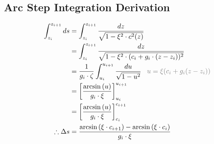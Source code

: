 \documentclass{article}
\begin{document}
\subsection{Arc Step Integration Derivation}
\begin{align*}
	\int_{z_i}^{z_{i+1}}ds & = \int_{z_i}^{z_{i+1}}\frac{dz}{\sqrt{1-\xi^2\cdot c^2(z)}}                                                       \\
	                       & = \int_{z_i}^{z_{i+1}}\frac{dz}{\sqrt{1-\xi^2\cdot (c_i + g_i\cdot(z - z_i))^2}}                                  \\
	                       & = \frac{1}{g_i\cdot\zeta}\int_{u_i}^{u_{i+1}}\frac{du}{\sqrt{1-u^2}}\textcolor{gray}{\;\;\;u=\xi(c_i+g_i(z-z_i))} \\
	                       & = \left[\frac{\arcsin{(u)}}{g_i\cdot\xi}\right]_{u_i}^{u_{i+1}}                                                   \\
	                       & = \left[\frac{\arcsin{(u)}}{g_i\cdot\xi}\right]_{c_i}^{c_{i+1}}                                                   \\
	\therefore \Delta s    & = \frac{\arcsin{(\xi\cdot c_{i+1})} - \arcsin{(\xi\cdot c_i)}}{g_i\cdot\xi}                                       \\
\end{align*}
\end{document}
